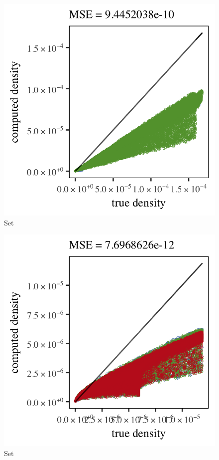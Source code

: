 \begin{subfigure}{0.3\textwidth}
	\centering
	\includegraphics[keepaspectratio=true, width=\textwidth, height=0.23\textheight]{4/img/results_ferdosi_4_600000_mbe_breiman}
	\caption{Set \ferdosiFour}
	\label{fig:4:simulated:datasets:mbe:ferdosi4}
\end{subfigure}
\begin{subfigure}{0.3\textwidth}
	\centering
	\includegraphics[keepaspectratio=true, width=\textwidth, height=0.23\textheight]{4/img/results_ferdosi_5_600000_mbe_breiman}
	\caption{Set \ferdosiFive}
	\label{fig:4:simulated:datasets:mbe:ferdosi5}
\end{subfigure}	